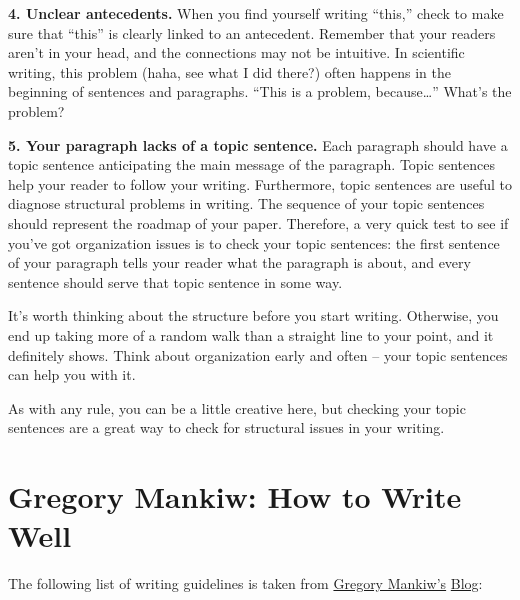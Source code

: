 \documentclass[]{book}
\theoremstyle{definition}
\theoremstyle{definition}
\theoremstyle{definition}
\theoremstyle{remark}
\begin{document}
\textbf{4. Unclear antecedents.}
When you find yourself writing ``this,'' check to make sure that ``this'' is clearly linked to an antecedent. Remember that your readers aren't in your head, and the connections may not be intuitive. In scientific writing, this problem (haha, see what I did there?) often happens in the beginning of sentences and paragraphs. ``This is a problem, because\ldots{}'' What's the problem?

\textbf{5. Your paragraph lacks of a topic sentence.}
Each paragraph should have a topic sentence anticipating the main message of the paragraph. Topic sentences help your reader to follow your writing. Furthermore, topic sentences are useful to diagnose structural problems in writing. The sequence of your topic sentences should represent the roadmap of your paper. Therefore, a very quick test to see if you've got organization issues is to check your topic sentences: the first sentence of your paragraph tells your reader what the paragraph is about, and every sentence should serve that topic sentence in some way.

It's worth thinking about the structure before you start writing. Otherwise, you end up taking more of a random walk than a straight line to your point, and it definitely shows. Think about organization early and often -- your topic sentences can help you with it.

As with any rule, you can be a little creative here, but checking your topic sentences are a great way to check for structural issues in your writing.

\hypertarget{gregory-mankiw-how-to-write-well}{%
\section{Gregory Mankiw: How to Write Well}\label{gregory-mankiw-how-to-write-well}}

The following list of writing guidelines is taken from \href{https://scholar.harvard.edu/mankiw/home}{Gregory Mankiw's} \href{http://gregmankiw.blogspot.com/2006/10/how-to-write-well.html}{Blog}:
\end{document}
